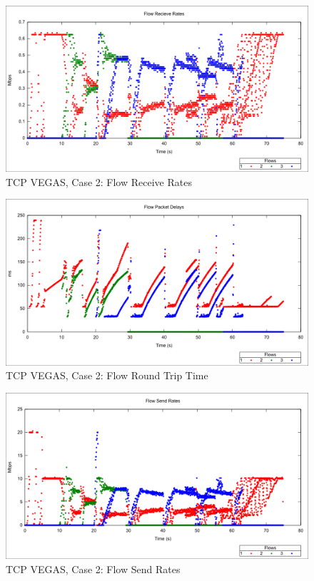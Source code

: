\begin{figure}[htbp]
    \centering
    \includegraphics[width=\textwidth]{vegas2/Flow_Receive_Rates.png}
    \caption{TCP VEGAS, Case 2: Flow Receive Rates }
\end{figure}


\begin{figure}[htbp]
    \centering
    \includegraphics[width=\textwidth]{vegas2/Flow_RTT.png}
    \caption{TCP VEGAS, Case 2: Flow Round Trip Time}
\end{figure}

\begin{figure}[htbp]
    \centering
    \includegraphics[width=\textwidth]{vegas2/Flow_Send_Rates.png}
    \caption{TCP VEGAS, Case 2: Flow Send Rates}
\end{figure}

